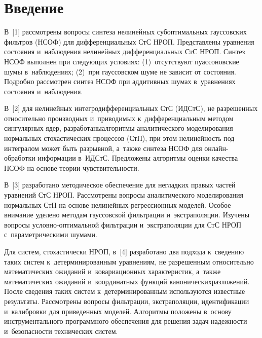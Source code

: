 
\thispagestyle{headings}

\begin{multicols}{2}

\label{st\stat}

\section{Введение}

\vspace*{-3pt}


В~[1] рассмотрены вопросы синтеза  нелинейных  субоптимальных гауссовских фильтров (НСОФ) для 
дифференциальных СтС НРОП. Представлены уравнения 
состояния и~наблюдения нелинейных дифференциальных СтС НРОП. 
Синтез НСОФ выполнен при следующих условиях: 
(1)~отсутствуют пуассоновские шумы в~наблюдениях; 
(2)~при гауссовском шуме не зависит от состояния.
 Подробно рассмотрен синтез НСОФ при аддитивных 
шумах в~уравнениях состояния и~наблюдения.

В~[2] для нелинейных интегродифференциальных СтС (ИДСтС), не разрешенных 
относительно производных и~приводимых к~дифференциальным методом сингулярных ядер, 
разработаны\linebreak алгоритмы аналитического моделирования нормальных стохастических процессов (СтП), при этом нелинейность 
под интегралом может быть разрывной, а~так\-же синтеза НСОФ для он\-лайн-об\-ра\-бот\-ки информации в~ИДСтС.
 Предложены алгоритмы оценки качества НСОФ на основе теории чувствительности.

В~[3] разработано методическое обеспечение для негладких правых частей уравнений СтС НРОП. 
Рассмотрены вопросы аналитического моделирования нормальных СтП на основе нелинейных регрессионных 
моделей. Особое внимание уделено методам гауссовской фильт\-ра\-ции и~экстраполяции. 
Изучены вопросы услов\-но-оп\-ти\-маль\-ной фильт\-ра\-ции и~экстраполяции для СтС НРОП с~параметрическими
 шумами.

Для систем, стохастически НРОП, в~[4] разработано два %
 подхода к~сведению 
таких сис\-тем к~детерминированным уравнениям, не разрешенным относительно математических 
ожиданий и~ковариационных характеристик, а~также математических {ожиданий} и~координатных функций
 канонических\linebreak разложений. После сведения таких сис\-тем к~детерминированным используются известные результаты.
Рассмотрены вопросы фильтрации, экстраполяции, идентификации и~калибровки для \mbox{приведенных} моделей.
Алгоритмы положены в~основу инструментального программного обеспечения для решения задач надежности 
и~безопас\-ности технических сис\-тем.
{

}
\end{multicols}
